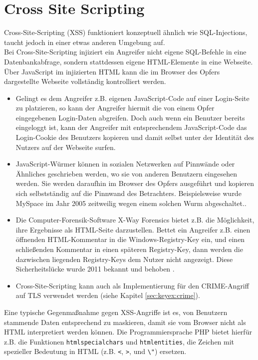 \section{Cross Site Scripting}

Cross-Site-Scripting (XSS) funktioniert konzeptuell ähnlich wie SQL-Injections, taucht jedoch in einer etwas anderen Umgebung auf.\\

Bei Cross-Site-Scripting injiziert ein Angreifer nicht eigene SQL-Befehle in eine Datenbankabfrage,
sondern stattdessen eigene HTML-Elemente in eine Webseite.
Über JavaScript im  injizierten HTML kann die im Browser des Opfers dargestellte Webseite vollständig kontrolliert werden.
\begin{itemize}
	\item Gelingt es dem Angreifer z.B. eigenen JavaScript-Code auf einer Login-Seite zu platzieren, so kann der Angreifer hiermit die von einem Opfer eingegebenen Login-Daten abgreifen.
Doch auch wenn ein Benutzer bereits eingeloggt ist, kann der Angreifer mit entsprechendem JavaScript-Code das Login-Cookie des Benutzers kopieren und damit selbst unter der Identität des Nutzers auf der Webseite surfen.
	\item JavaScript-Würmer können in sozialen Netzwerken auf Pinnwände oder Ähnliches geschrieben werden, wo sie von anderen Benutzern eingesehen werden. Sie werden daraufhin im Browser des Opfers ausgeführt und kopieren sich selbstständig auf die Pinnwand des Betrachters.
Beispielsweise wurde MySpace im Jahr 2005 zeitweilig wegen einem solchen Wurm abgeschaltet.\cite{Kamkar2005, Sophos}.
	\item Die Computer-Forensik-Software X-Way Forensics bietet z.B. die Möglichkeit, ihre Ergebnisse als HTML-Seite darzustellen.
Bettet ein Angreifer z.B. einen öffnenden HTML-Kommentar in die Windows-Registry-Key ein, und einen schließenden Kommentar in einen späteren Registry-Key, dann werden die dazwischen liegenden Registry-Keys dem Nutzer nicht angezeigt.
Diese Sicherheitslücke wurde 2011 bekannt und behoben \cite{Wundram2011}.
	\item Cross-Site-Scripting kann auch als Implementierung für den CRIME-Angriff auf TLS verwendet werden (siehe Kapitel \ref{sec:keyex:crime}).
\end{itemize}

Eine typische Gegenmaßnahme gegen XSS-Angriffe ist es, von Benutzern stammende Daten entsprechend zu maskieren, damit sie vom Browser nicht als HTML interpretiert werden können.
Die Programmiersprache PHP bietet hierfür z.B. die Funktionen \lstinline+htmlspecialchars+ und \lstinline+htmlentities+, die Zeichen mit spezieller Bedeutung in HTML (z.B. \lstinline+<+, \lstinline+>+, und \lstinline+\"+) ersetzen.

